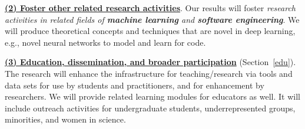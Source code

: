 \noindent\underline{{\bf (2) Foster other related research
    activities}}. Our results will foster {\em research activities in
  related fields of {\bf machine learning} and {\bf software
    engineering}}. We will produce theoretical concepts and techniques
that are novel in deep learning, e.g., novel neural networks to model
and learn for code.


\noindent\underline{{\bf (3) Education, dissemination, and broader
    participation}} (Section~\ref{edu}). The research will enhance the
infrastructure for teaching/research via tools and data sets for use
by students and practitioners, and for enhancement by researchers. We
will provide related learning modules for educators as well. It will
include outreach activities for undergraduate students,
underrepresented groups, minorities, and women in science.
